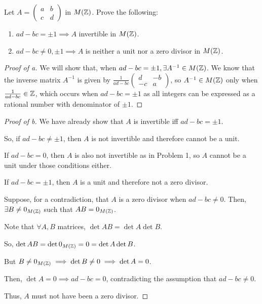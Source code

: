 \documentclass[../hw4]{subfiles}
\begin{document}
\begin{problem}
Let $A=\begin{pmatrix} a&b\\c&d \end{pmatrix} $  in $M(\mathbb{Z})$.
Prove the following:
\begin{enumerate}[label=\alph*)]
	\item $ad-bc= \pm 1 \implies A$ invertible in $M(\mathbb{Z})$.
	\item $ad-bc\neq 0, \pm 1 \implies A$ is neither a unit nor a zero divisor in $M(\mathbb{Z})$.
\end{enumerate}
\end{problem}
\begin{proof}[Proof of a]
	We will show that, when $ad-bc= \pm 1, \exists A^{-1}\in M(\mathbb{Z})$.
	We know that the inverse matrix $A^{-1}$ is given by $\frac{1}{ad-bc}\begin{pmatrix} d&-b\\-c&a \end{pmatrix} $, so $A^{-1}\in M(\mathbb{Z})$ only when $\frac{1}{ad-bc}\in \mathbb{Z}$, which occurs when $ad-bc= \pm 1$ as all integers can be expressed as a rational number with denominator of $ \pm 1$.
\end{proof}
\begin{proof}[Proof of b]
	We have already show that $A$ is invertible iff $ad-bc= \pm 1$.

	So, if $ad-bc\neq  \pm 1$, then $A$ is not invertible and therefore cannot be a unit.

	If $ad-bc=0$, then $A$ is also not invertible as in Problem 1,
	so $A$ cannot be a unit under those conditions either.

	If $ad-bc =  \pm 1$, then $A$ is a unit and therefore not a zero divisor.

	Suppose, for a contradiction, that $A$ is a zero divisor when $ad-bc \neq 0$.
	Then,  $\exists B\neq 0_{M(\mathbb{Z})}$ such that $AB=0_{M(\mathbb{Z})}$.

	Note that $\forall A,B$ matrices, $\det{AB}=\det{A}\det{B}$.

	So, $\det{AB}=\det{0_{M(\ensuremath{\mathbb{Z}})}} = 0 = \det{A}\det{B}$.

	But $B\neq 0_{M(\mathbb{Z})}\implies\det{B } \neq 0 \implies \det{A }= 0$.

	Then, $\det{A } = 0 \implies ad-bc = 0$, contradicting the assumption that $ad-bc\neq 0$.

	Thus, $A$ must not have been a zero divisor.
\end{proof}
\end{document}
